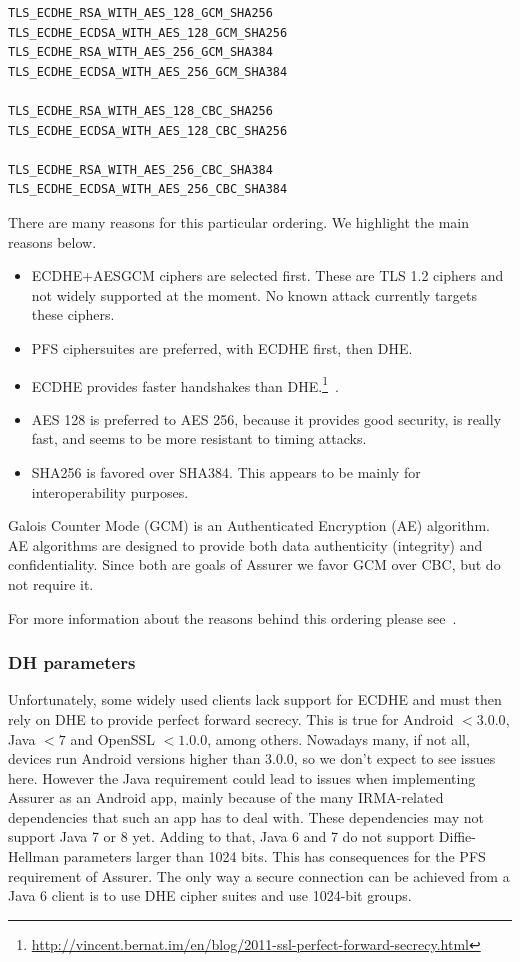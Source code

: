 \begin{verbatim}
TLS_ECDHE_RSA_WITH_AES_128_GCM_SHA256
TLS_ECDHE_ECDSA_WITH_AES_128_GCM_SHA256
TLS_ECDHE_RSA_WITH_AES_256_GCM_SHA384
TLS_ECDHE_ECDSA_WITH_AES_256_GCM_SHA384

TLS_ECDHE_RSA_WITH_AES_128_CBC_SHA256
TLS_ECDHE_ECDSA_WITH_AES_128_CBC_SHA256

TLS_ECDHE_RSA_WITH_AES_256_CBC_SHA384
TLS_ECDHE_ECDSA_WITH_AES_256_CBC_SHA384
\end{verbatim}

There are many reasons for this particular ordering. We highlight the main reasons below. 

\begin{itemize}
  \item ECDHE+AESGCM ciphers are selected first. These are TLS 1.2 ciphers and not widely supported at the moment. No known attack currently targets these ciphers.
  \item PFS ciphersuites are preferred, with ECDHE first, then DHE.
	\item ECDHE provides faster handshakes than DHE.\footnote{\url{http://vincent.bernat.im/en/blog/2011-ssl-perfect-forward-secrecy.html}}~\cite{pfsprice}.
  \item AES 128 is preferred to AES 256, because it provides good security, is really fast, and seems to be more resistant to timing attacks.
  \item SHA256 is favored over SHA384. This appears to be mainly for interoperability purposes.
\end{itemize}

Galois Counter Mode (GCM) is an Authenticated Encryption (AE) algorithm. AE algorithms are designed to provide both data authenticity (integrity) and confidentiality. Since both are goals of Assurer we favor GCM over CBC, but do not require it.

For more information about the reasons behind this ordering please see~\cite{mozilla}.

\subsubsection{DH parameters}
Unfortunately, some widely used clients lack support for ECDHE and must then rely on DHE to provide perfect forward secrecy. This is true for Android $< 3.0.0$, Java $< 7$ and OpenSSL $< 1.0.0$, among others. Nowadays many, if not all, devices run Android versions higher than 3.0.0, so we don't expect to see issues here. However the Java requirement could lead to issues when implementing Assurer as an Android app, mainly because of the many IRMA-related dependencies that such an app has to deal with. These dependencies may not support Java 7 or 8 yet. Adding to that, Java 6 and 7 do not support Diffie-Hellman parameters larger than 1024 bits. This has consequences for the PFS requirement of Assurer. The only way a secure connection can be achieved from a Java 6 client is to use DHE cipher suites and use 1024-bit groups.

